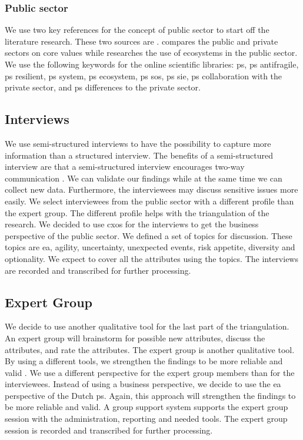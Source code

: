 \subsubsection{Public sector}
\label{subsub:publicsector}
We use two key references for the concept of public sector to start off the literature research. These two sources are \textcites{Wal2008}{Nurmi2021}. \textcite{Wal2008} compares the public and private sectors on core values while \textcite{Nurmi2021} researches the use of ecosystems in the public sector. We use the following keywords for the online scientific libraries: \gls{ps}, \gls{ps} \gls{antifragile}, \gls{ps} \gls{resilient}, \gls{ps} system, \gls{ps} ecosystem, \gls{ps} \gls{sos}, \gls{ps} \gls{sie}, \gls{ps} collaboration with the private sector, and \gls{ps} differences to the private sector.

\subsection{Interviews}
\label{sub:interviews}
We use semi-structured interviews to have the possibility to capture more information than a structured interview. The benefits of a semi-structured interview are that a semi-structured interview encourages two-way communication \parencite[pp.~87--88]{Recker2012}. We can validate our findings while at the same time we can collect new data. Furthermore, the interviewees may discuss sensitive issues more easily. We select interviewees from the public sector with a different profile than the expert group. The different profile helps with the triangulation of the research. We decided to use \glspl{cxo} for the interviews to get the business perspective of the public sector. We defined a set of topics for discussion. These topics are \acrlong{ea}, \gls{agility}, \gls{uncertainty}, unexpected events, risk appetite, \gls{diversity} and \gls{optionality}. We expect to cover all the attributes using the topics. The interviews are recorded and transcribed for further processing.

\subsection{Expert Group}
\label{sub:expertgroup}
We decide to use another qualitative tool for the last part of the \gls{triangulation}. An expert group will brainstorm for possible new \glspl{attribute}, discuss the \glspl{attribute}, and rate the \glspl{attribute}. The expert group is another qualitative tool. By using a different tools, we strengthen the findings to be more reliable and valid \parencite[p.~88]{Recker2012}. We use a different perspective for the expert group members than for the interviewees. Instead of using a business perspective, we decide to use the \acrlong{ea} perspective of the Dutch \gls{ps}. Again, this approach will strengthen the findings to be more reliable and valid. A group support system supports the expert group session with the administration, reporting and needed tools. The expert group session is recorded and transcribed for further processing.

